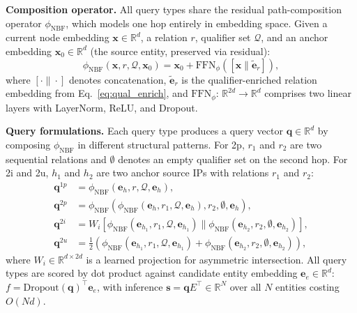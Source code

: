 \documentclass[10pt,journal,compsoc]{IEEEtran}
\begin{document}
\noindent\textbf{Composition operator.}
All query types share the residual path-composition
operator $\phi_{\mathrm{NBF}}$, which models one
hop entirely in embedding space. Given a current
node embedding $\mathbf{x} \in \mathbb{R}^d$,
a relation $r$, qualifier set $\mathcal{Q}$, and
an anchor embedding $\mathbf{x}_0 \in \mathbb{R}^d$
(the source entity, preserved via residual):
\begin{equation}
  \phi_{\mathrm{NBF}}(\mathbf{x}, r,
  \mathcal{Q}, \mathbf{x}_0)
  = \mathbf{x}_0
    + \mathrm{FFN}_\phi([\mathbf{x}
    \| \tilde{\mathbf{e}}_r]),
  \label{eq:nbfqe_compose}
\end{equation}
where $[\cdot\|\cdot]$ denotes concatenation,
$\tilde{\mathbf{e}}_r$ is the qualifier-enriched
relation embedding from Eq.~\ref{eq:qual_enrich},
and $\mathrm{FFN}_\phi{:}\,\mathbb{R}^{2d}
\to \mathbb{R}^d$ comprises two linear layers
with LayerNorm, ReLU, and Dropout.

\noindent\textbf{Query formulations.}
Each query type produces a query vector
$\mathbf{q} \in \mathbb{R}^d$ by composing
$\phi_{\mathrm{NBF}}$ in different structural
patterns. For 2p, $r_1$ and $r_2$ are two
sequential relations and $\emptyset$ denotes
an empty qualifier set on the second hop.
For 2i and 2u, $h_1$ and $h_2$ are two anchor
source IPs with relations $r_1$ and $r_2$:
\begin{align}
  \mathbf{q}^{1p}
  &= \phi_{\mathrm{NBF}}(\mathbf{e}_h, r,
    \mathcal{Q}, \mathbf{e}_h),
  \label{eq:nbfqe_1p} \\
  \mathbf{q}^{2p}
  &= \phi_{\mathrm{NBF}}(
    \phi_{\mathrm{NBF}}(\mathbf{e}_h, r_1,
    \mathcal{Q}, \mathbf{e}_h),
    r_2, \emptyset, \mathbf{e}_h),
  \label{eq:nbfqe_2p} \\
  \mathbf{q}^{2i}
  &= W_i[\phi_{\mathrm{NBF}}(\mathbf{e}_{h_1},
    r_1, \mathcal{Q}, \mathbf{e}_{h_1})
    \| \phi_{\mathrm{NBF}}(\mathbf{e}_{h_2},
    r_2, \emptyset, \mathbf{e}_{h_2})],
  \label{eq:nbfqe_2i} \\
  \mathbf{q}^{2u}
  &= \tfrac{1}{2}(
    \phi_{\mathrm{NBF}}(\mathbf{e}_{h_1},
    r_1, \mathcal{Q}, \mathbf{e}_{h_1})
    + \phi_{\mathrm{NBF}}(\mathbf{e}_{h_2},
    r_2, \emptyset, \mathbf{e}_{h_2})),
  \label{eq:nbfqe_2u}
\end{align}
where $W_i \in \mathbb{R}^{d \times 2d}$ is a
learned projection for asymmetric intersection.
All query types are scored by dot product against
candidate entity embedding
$\mathbf{e}_e \in \mathbb{R}^d$:
$f = \mathrm{Dropout}(\mathbf{q})^\top \mathbf{e}_e$,
with inference $\mathbf{s} = \mathbf{q} E^\top
\in \mathbb{R}^N$ over all $N$ entities costing
$O(Nd)$.
\end{document}

